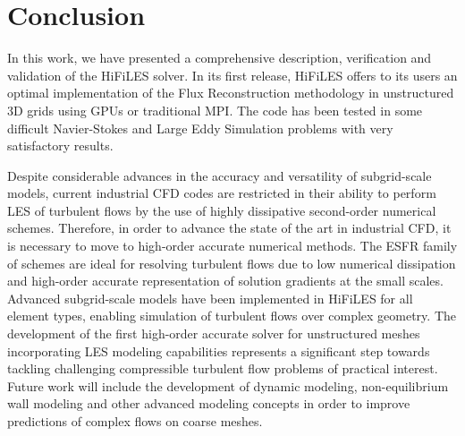 
\section{Conclusion}
\label{sec:conclusion}

In this work, we have presented a comprehensive description, verification and validation of the HiFiLES solver. In its first release, HiFiLES offers to its users an optimal implementation of the Flux Reconstruction methodology in unstructured 3D grids using GPUs or traditional MPI. The code has been tested in some difficult Navier-Stokes and Large Eddy Simulation problems with very satisfactory results.

Despite considerable advances in the accuracy and versatility of subgrid-scale models, current industrial CFD codes are restricted in their ability to perform LES of turbulent flows by the use of highly dissipative second-order numerical schemes.
Therefore, in order to advance the state of the art in industrial CFD, it is necessary to move to high-order accurate numerical methods.
The ESFR family of schemes are ideal for resolving turbulent flows due to low numerical dissipation and high-order accurate representation of solution gradients at the small scales.
Advanced subgrid-scale models have been implemented in HiFiLES for all element types, enabling simulation of turbulent flows over complex geometry.
The development of the first high-order accurate solver for unstructured meshes incorporating LES modeling capabilities represents a significant step towards tackling challenging compressible turbulent flow problems of practical interest.
Future work will include the development of dynamic modeling, non-equilibrium wall modeling and other advanced modeling concepts in order to improve predictions of complex flows on coarse meshes.